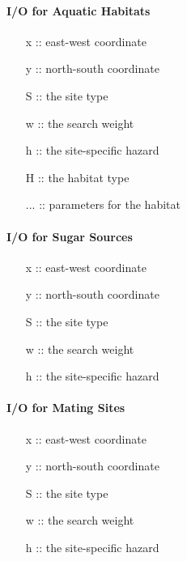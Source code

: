 \documentclass{article}
\begin{document}
\paragraph{I/O for Aquatic Habitats}

\begin{itemize}
\item [x] :: east-west coordinate
\item [y] :: north-south coordinate
\item [S] :: the site type
\item [w] :: the search weight
\item [h] :: the site-specific hazard
\item [H] :: the habitat type
\item [...] :: parameters for the habitat 
\end{itemize} 

\paragraph{I/O for Sugar Sources}

\begin{itemize}
\item [x] :: east-west coordinate
\item [y] :: north-south coordinate
\item [S] :: the site type
\item [w] :: the search weight
\item [h] :: the site-specific hazard
\end{itemize} 

\paragraph{I/O for Mating Sites}

\begin{itemize}
\item [x] :: east-west coordinate
\item [y] :: north-south coordinate
\item [S] :: the site type
\item [w] :: the search weight
\item [h] :: the site-specific hazard
\end{itemize} 
\end{document}
